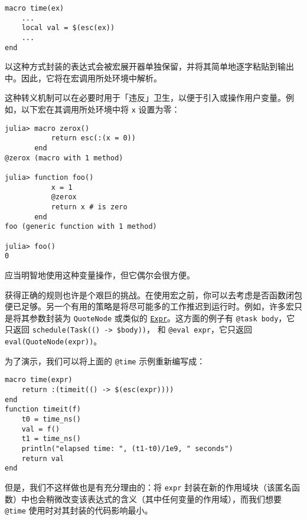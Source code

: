 \begin{verbatim}
macro time(ex)
    ...
    local val = $(esc(ex))
    ...
end
\end{verbatim}



以这种方式封装的表达式会被宏展开器单独保留，并将其简单地逐字粘贴到输出中。因此，它将在宏调用所处环境中解析。



这种转义机制可以在必要时用于「违反」卫生，以便于引入或操作用户变量。例如，以下宏在其调用所处环境中将 \texttt{x} 设置为零：




\begin{verbatim}
julia> macro zerox()
           return esc(:(x = 0))
       end
@zerox (macro with 1 method)

julia> function foo()
           x = 1
           @zerox
           return x # is zero
       end
foo (generic function with 1 method)

julia> foo()
0
\end{verbatim}



应当明智地使用这种变量操作，但它偶尔会很方便。



获得正确的规则也许是个艰巨的挑战。在使用宏之前，你可以去考虑是否函数闭包便已足够。另一个有用的策略是将尽可能多的工作推迟到运行时。例如，许多宏只是将其参数封装为 \texttt{QuoteNode} 或类似的 \hyperlink{17120496304147995299}{\texttt{Expr}}。这方面的例子有 \texttt{@task body}，它只返回 \texttt{schedule(Task(() -> \$body))}， 和 \texttt{@eval expr}，它只返回 \texttt{eval(QuoteNode(expr))}。



为了演示，我们可以将上面的 \texttt{@time} 示例重新编写成：




\begin{verbatim}
macro time(expr)
    return :(timeit(() -> $(esc(expr))))
end
function timeit(f)
    t0 = time_ns()
    val = f()
    t1 = time_ns()
    println("elapsed time: ", (t1-t0)/1e9, " seconds")
    return val
end
\end{verbatim}



但是，我们不这样做也是有充分理由的：将 \texttt{expr} 封装在新的作用域块（该匿名函数）中也会稍微改变该表达式的含义（其中任何变量的作用域），而我们想要 \texttt{@time} 使用时对其封装的代码影响最小。



